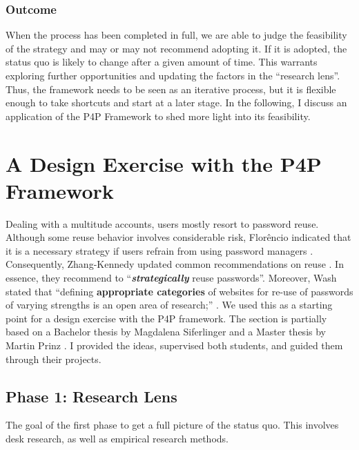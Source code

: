 \subsubsection{Outcome}
When the process has been completed in full, we are able to judge the feasibility of the strategy and may or may not recommend adopting it. If it is adopted, the status quo is likely to change after a given amount of time. This warrants exploring further opportunities and updating the factors in the ``research lens''. Thus, the framework needs to be seen as an iterative process, but it is flexible enough to take shortcuts and start at a later stage. In the following, I discuss an application of the P4P Framework to shed more light into its feasibility. 


\section{A Design Exercise with the P4P Framework}
Dealing with a multitude accounts, users mostly resort to password reuse. Although some reuse behavior involves considerable risk, Florêncio \etal indicated that it is a necessary strategy if users refrain from using password managers \cite{Florencio2014PasswordPortfoliosFiniteUser}. Consequently, Zhang-Kennedy \etal updated common recommendations on reuse  \cite{ZhangKennedy2016RevisitingPasswordRules}. In essence, they recommend to ``\textit{\textbf{strategically}} reuse passwords''. Moreover, Wash \etal stated that ``defining \textbf{appropriate categories} of websites for re-use of passwords of varying strengths is an open area of research;'' \cite{Wash2016UnderstandingPasswordChoices}. We used this as a starting point for a design exercise with the P4P framework. The section is partially based on a Bachelor thesis by Magdalena Siferlinger \cite{Siferlinger2017BAThesis} and a Master thesis by Martin Prinz \cite{Prinz2017Thesis}. I provided the ideas, supervised both students, and guided them through their projects.

\subsection{Phase 1: Research Lens}
The goal of the first phase to get a full picture of the status quo. This involves desk research, as well as empirical research methods. 

